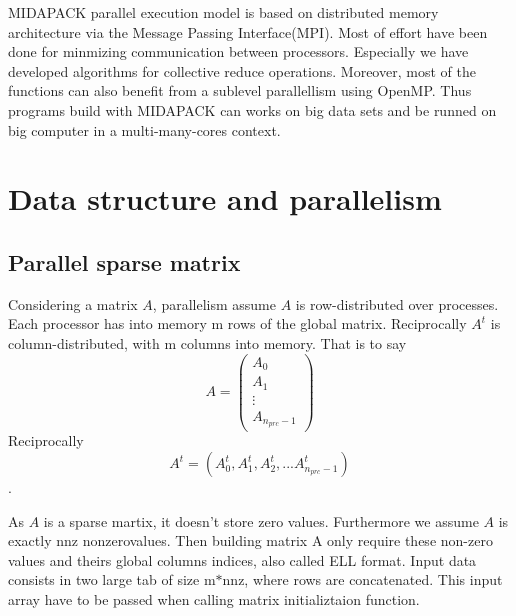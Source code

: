 M\-I\-D\-A\-P\-A\-C\-K parallel execution model is based on distributed memory architecture via the Message Passing Interface(\-M\-P\-I). Most of effort have been done for minmizing communication between processors. Especially we have developed algorithms for collective reduce operations. Moreover, most of the functions can also benefit from a sublevel parallellism using Open\-M\-P. Thus programs build with M\-I\-D\-A\-P\-A\-C\-K can works on big data sets and be runned on big computer in a multi-\/many-\/cores context.

\par
 \hypertarget{data_struct_parall}{}\section{Data structure and parallelism}\label{data_struct_parall}
\hypertarget{data_struct_parall_input_struct}{}\subsection{Parallel sparse matrix}\label{data_struct_parall_input_struct}
Considering a matrix $A$, parallelism assume $A$ is row-\/distributed over processes. Each processor has into memory m rows of the global matrix. Reciprocally $A^t$ is column-\/distributed, with m columns into memory. That is to say \[ A = \left( \begin{array}{c}A_0 \\A_1\\ \vdots \\ A_{n_{prc}-1} \end{array} \right) \] Reciprocally \[ A^t=(A_0^t, A_1^t, A_2^t, ... A_{n_{prc}-1}^t) \].

As $A$ is a sparse martix, it doesn't store zero values. Furthermore we assume $A$ is exactly nnz nonzerovalues. Then building matrix A only require these non-\/zero values and theirs global columns indices, also called E\-L\-L format. Input data consists in two large tab of size m$\ast$nnz, where rows are concatenated. This input array have to be passed when calling matrix initializtaion function.

